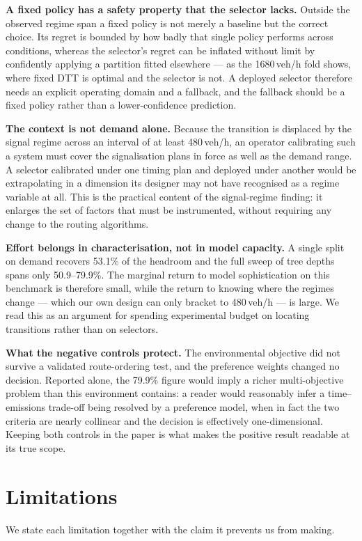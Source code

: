 \documentclass[10pt,a4paper]{article}
\begin{document}
\textbf{A fixed policy has a safety property that the selector lacks.} Outside the observed regime span a fixed policy is not merely a baseline but the correct choice. Its regret is bounded by how badly that single policy performs across conditions, whereas the selector's regret can be inflated without limit by confidently applying a partition fitted elsewhere --- as the 1680\,veh/h fold shows, where fixed DTT is optimal and the selector is not. A deployed selector therefore needs an explicit operating domain and a fallback, and the fallback should be a fixed policy rather than a lower-confidence prediction.

\textbf{The context is not demand alone.} Because the transition is displaced by the signal regime across an interval of at least 480\,veh/h, an operator calibrating such a system must cover the signalisation plans in force as well as the demand range. A selector calibrated under one timing plan and deployed under another would be extrapolating in a dimension its designer may not have recognised as a regime variable at all. This is the practical content of the signal-regime finding: it enlarges the set of factors that must be instrumented, without requiring any change to the routing algorithms.

\textbf{Effort belongs in characterisation, not in model capacity.} A single split on demand recovers 53.1\% of the headroom and the full sweep of tree depths spans only 50.9--79.9\%. The marginal return to model sophistication on this benchmark is therefore small, while the return to knowing where the regimes change --- which our own design can only bracket to 480\,veh/h --- is large. We read this as an argument for spending experimental budget on locating transitions rather than on selectors.

\textbf{What the negative controls protect.} The environmental objective did not survive a validated route-ordering test, and the preference weights changed no decision. Reported alone, the 79.9\% figure would imply a richer multi-objective problem than this environment contains: a reader would reasonably infer a time--emissions trade-off being resolved by a preference model, when in fact the two criteria are nearly collinear and the decision is effectively one-dimensional. Keeping both controls in the paper is what makes the positive result readable at its true scope.

\section{Limitations}
We state each limitation together with the claim it prevents us from making.
\end{document}

